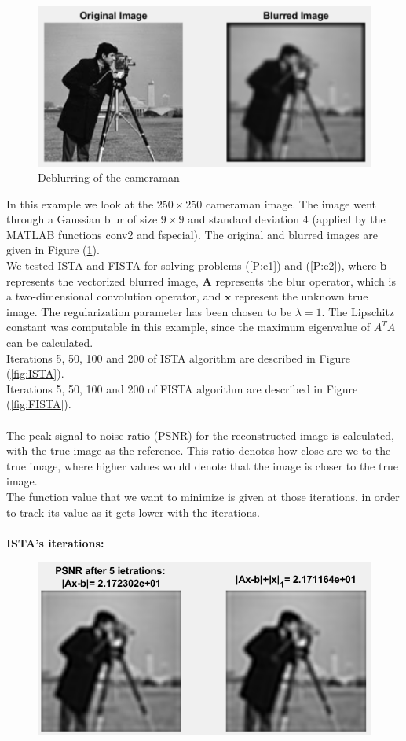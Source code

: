 \documentclass[12pt]{article}
\begin{document}
\begin{figure}[H]
\centering
\includegraphics[scale=1]{OrgVSBlurr.png}
\caption{Deblurring of the cameraman}
\label{fig:Deb-Prob}
\end{figure}
In this example we look at the $250\times250$ cameraman image. The image went through a Gaussian blur of size $9\times9$ and standard deviation 4 (applied by the MATLAB functions conv2 and fspecial). The original and blurred images are given in Figure (\ref{fig:Deb-Prob}).\\
We tested ISTA and FISTA for solving problems (\ref{P:e1}) and (\ref{P:e2}),
where $\boldsymbol{b}$ represents the vectorized blurred image, $\boldsymbol{A}$ represents the blur operator, which is a two-dimensional convolution operator, and $\boldsymbol{x}$ represent the unknown true image.
The regularization parameter has been chosen to be $\lambda = 1$.
The Lipschitz constant was computable in this example, since the maximum eigenvalue of $A^T A$ can be calculated. \\
Iterations 5, 50, 100 and 200 of ISTA algorithm are described in Figure (\ref{fig:ISTA}).\\
Iterations 5, 50, 100 and 200 of FISTA algorithm are described in Figure (\ref{fig:FISTA}).\\
\\The peak signal to noise ratio (PSNR) for the reconstructed image is calculated, with the true image as the reference. This ratio denotes how close are we to the true image, where higher values would denote that the image is closer to the true image.\\
The function value that we want to minimize is given at those iterations, in order to track its value as it gets lower with the iterations.\\
\\\textbf{ISTA's iterations:}
\begin{figure}[H]
  \centering
    \includegraphics[scale=0.6]{Ista5.png}
 \end{figure}
\end{document}
